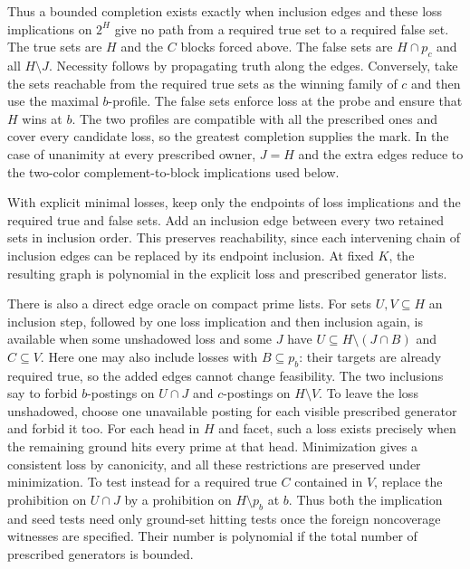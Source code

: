 Thus a bounded completion exists exactly when inclusion
edges and these loss implications on $2^H$ give no path
from a required true set to a required false set. The true
sets are $H$ and the $C$ blocks forced above. The false
sets are $H\cap p_c$ and all $H\setminus J$. Necessity
follows by propagating truth along the edges. Conversely,
take the sets reachable from the required true sets as the
winning family of $c$ and then use the maximal $b$-profile.
The false sets enforce loss at the probe and ensure that
$H$ wins at $b$. The two profiles are compatible with
all the prescribed ones and cover every candidate loss,
so the greatest completion supplies the mark. In the case
of unanimity at every prescribed owner, $J=H$ and the
extra edges reduce to the two-color complement-to-block
implications used below.

With explicit minimal losses, keep only the endpoints of loss
implications and the required true and false sets. Add an
inclusion edge between every two retained sets in inclusion
order. This preserves reachability, since each intervening
chain of inclusion edges can be replaced by its endpoint
inclusion. At fixed $K$, the resulting graph is polynomial in
the explicit loss and prescribed generator lists.

There is also a direct edge oracle on compact prime lists.
For sets $U,V\subseteq H$ an inclusion step, followed by
one loss implication and then inclusion again, is available
when some unshadowed loss and some $J$ have
$U\subseteq H\setminus(J\cap B)$ and $C\subseteq V$.
Here one may also include losses with $B\subseteq p_b$:
their targets are already required true, so the added edges
cannot change feasibility. The two inclusions say to forbid
$b$-postings on $U\cap J$ and $c$-postings on $H\setminus V$.
To leave the loss unshadowed, choose one unavailable posting
for each visible prescribed generator and forbid it too.
For each head in $H$ and facet, such a loss exists precisely
when the remaining ground hits every prime at that head.
Minimization gives a consistent loss by canonicity, and
all these restrictions are preserved under minimization.
To test instead for a required true $C$ contained in $V$,
replace the prohibition on $U\cap J$ by a prohibition on
$H\setminus p_b$ at $b$. Thus both the implication and
seed tests need only ground-set hitting tests once the
foreign noncoverage witnesses are specified. Their number
is polynomial if the total number of prescribed generators
is bounded.

